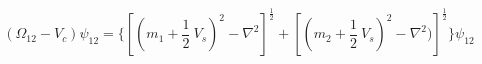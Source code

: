 \begin{equation}
(\Omega_{12}-V_c)\psi_{12}=\{ [(m_1+\frac{1}{2}~V_s)^2 -\nabla^2]^{\frac{1}{2}} + [(m_2 +\frac{1}{2}~V_s)^2 -\nabla^2)]^{\frac{1}{2}} \} \psi_{12} \label{eq:bir}
\end{equation}

